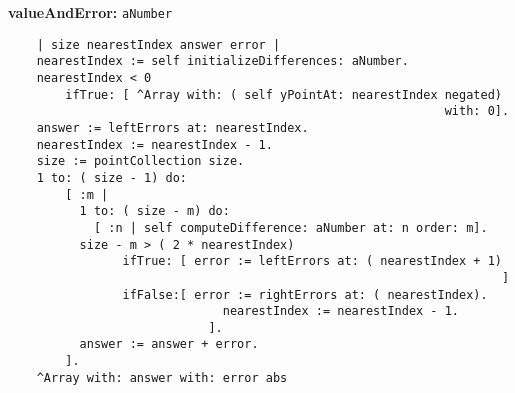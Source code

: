 {\bf valueAndError:} {\tt aNumber}
\begin{verbatim}
    | size nearestIndex answer error |
    nearestIndex := self initializeDifferences: aNumber.
    nearestIndex < 0
        ifTrue: [ ^Array with: ( self yPointAt: nearestIndex negated) 
                                                             with: 0].
    answer := leftErrors at: nearestIndex.
    nearestIndex := nearestIndex - 1.
    size := pointCollection size.
    1 to: ( size - 1) do:
        [ :m |
          1 to: ( size - m) do:
            [ :n | self computeDifference: aNumber at: n order: m].
          size - m > ( 2 * nearestIndex)
                ifTrue: [ error := leftErrors at: ( nearestIndex + 1) 
                                                                     ]
                ifFalse:[ error := rightErrors at: ( nearestIndex).
                              nearestIndex := nearestIndex - 1.
                            ].
          answer := answer + error.
        ].
    ^Array with: answer with: error abs

\end{verbatim}

